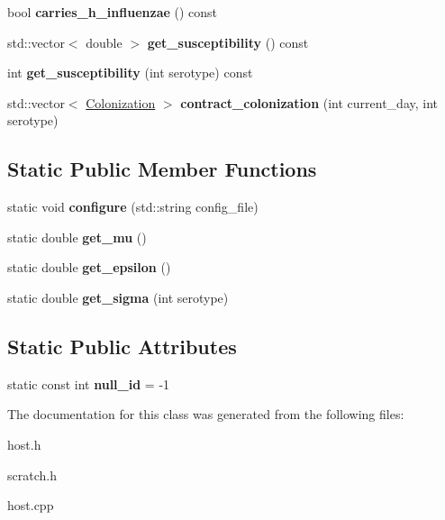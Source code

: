 \begin{DoxyCompactItemize}
bool {\bfseries carries\+\_\+h\+\_\+influenzae} () const
\item 
\mbox{\label{class_host_a593fe078d0255875a33056b6f9a2cbe3}} 
std\+::vector$<$ double $>$ {\bfseries get\+\_\+susceptibility} () const
\item 
\mbox{\label{class_host_ab2b55c0299e4c3e6b3bc71cf0fdc34d4}} 
int {\bfseries get\+\_\+susceptibility} (int serotype) const
\item 
\mbox{\label{class_host_ae23de85c01a34c5d93f4d79d7e82c0c5}} 
std\+::vector$<$ \hyperlink{class_colonization}{Colonization} $>$ {\bfseries contract\+\_\+colonization} (int current\+\_\+day, int serotype)
\end{DoxyCompactItemize}
\subsection*{Static Public Member Functions}
\begin{DoxyCompactItemize}
\item 
\mbox{\label{class_host_a10ff430743fa050d2a0086c8bcd89704}} 
static void {\bfseries configure} (std\+::string config\+\_\+file)
\item 
\mbox{\label{class_host_a09f87177afc14c88e5573a9c68e4f63c}} 
static double {\bfseries get\+\_\+mu} ()
\item 
\mbox{\label{class_host_ae82c8599759f4f889b6cfbf2657a1681}} 
static double {\bfseries get\+\_\+epsilon} ()
\item 
\mbox{\label{class_host_ab37282c2ba5ce3dc9eb369c3f6fb3da8}} 
static double {\bfseries get\+\_\+sigma} (int serotype)
\end{DoxyCompactItemize}
\subsection*{Static Public Attributes}
\begin{DoxyCompactItemize}
\item 
\mbox{\label{class_host_a3b5e58bfb12808bf0dc228d2b4e1705b}} 
static const int {\bfseries null\+\_\+id} = -\/1
\end{DoxyCompactItemize}


The documentation for this class was generated from the following files\+:\begin{DoxyCompactItemize}
\item 
host.\+h\item 
scratch.\+h\item 
host.\+cpp\end{DoxyCompactItemize}
